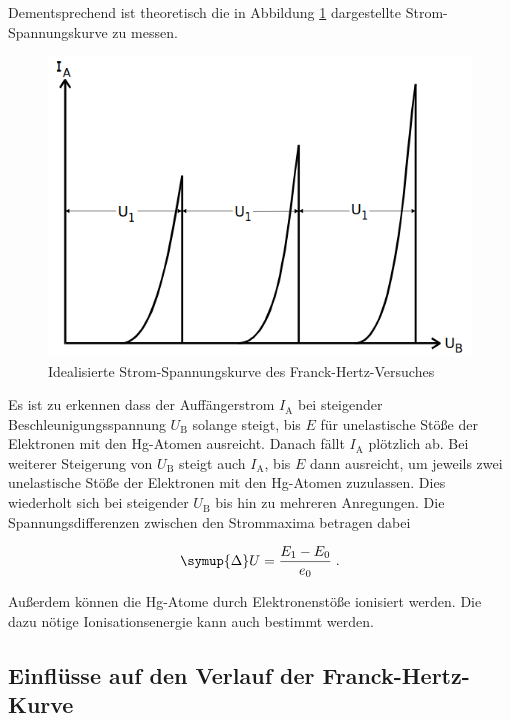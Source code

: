 Dementsprechend ist theoretisch die in Abbildung \ref{fig:bild2} dargestellte Strom-Spannungskurve zu messen.

\begin{figure} [H]
    \centering
    \includegraphics{content/bild2.png}
    \caption{Idealisierte Strom-Spannungskurve des Franck-Hertz-Versuches}
    \label{fig:bild2}
  \end{figure}

  Es ist zu erkennen dass der Auffängerstrom $I_\text{A}$ bei steigender Beschleunigungsspannung $U_\text{B}$
  solange steigt, bis $E$ für unelastische Stöße der Elektronen mit den Hg-Atomen ausreicht. Danach
  fällt $I_\text{A}$ plötzlich ab. Bei weiterer Steigerung von $U_\text{B}$ steigt auch $I_\text{A}$,
  bis $E$ dann ausreicht, um jeweils zwei unelastische Stöße der Elektronen mit den Hg-Atomen zuzulassen.
  Dies wiederholt sich bei steigender $U_\text{B}$ bis hin zu mehreren Anregungen.
  Die Spannungsdifferenzen zwischen den Strommaxima betragen dabei

  \begin{equation}
      \symup{\Delta}U = \frac{E_1 - E_0}{e_0} \; .
  \end{equation}

Außerdem können die Hg-Atome durch Elektronenstöße ionisiert werden.
Die dazu nötige Ionisationsenergie kann auch bestimmt werden. 


\subsection{Einflüsse auf den Verlauf der Franck-Hertz-Kurve}

